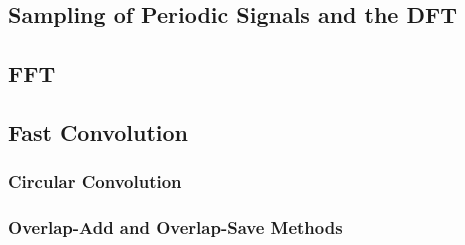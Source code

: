 \subsection{Sampling of Periodic Signals and the DFT}

\subsection{FFT}

\subsection{Fast Convolution}
\subsubsection{Circular Convolution}
\subsubsection{Overlap-Add and Overlap-Save Methods}


